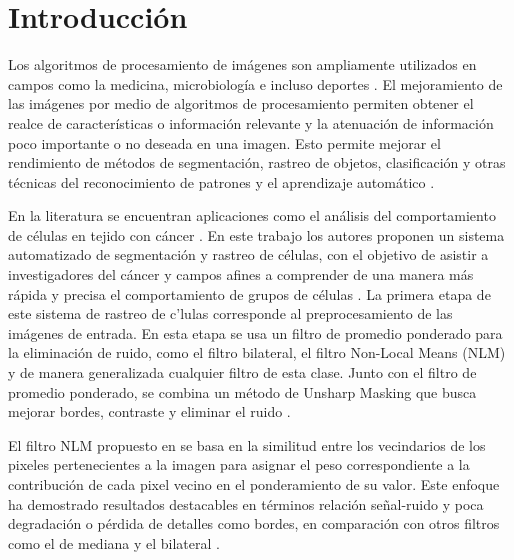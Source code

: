 
\chapter{Introducción}
\label{chp:intro}

Los algoritmos de procesamiento de im\'agenes son ampliamente utilizados en campos como la medicina, microbiolog\'ia e incluso deportes \cite{Aggarwal2011,	Ekin2003, Ekin2003}. El mejoramiento de las im\'agenes por medio de algoritmos de procesamiento permiten obtener el realce de caracter\'isticas o informaci\'on relevante y la atenuaci\'on de informaci\'on poco importante o no deseada en una imagen. Esto permite mejorar el rendimiento de m\'etodos de segmentaci\'on, rastreo de objetos, clasificaci\'on y otras t\'ecnicas del reconocimiento de patrones y el aprendizaje autom\'atico \cite{BF2014,IMPROVESEGMENTATIONBF,CONCAPAN2016}. 

En la literatura se encuentran aplicaciones como el an\'alisis del comportamiento de c\'elulas en tejido con  c\'ancer \cite{saenz2015deceived}. En este trabajo los autores proponen un sistema automatizado de segmentaci\'on y rastreo de c\'elulas, con el objetivo de asistir a investigadores del c\'ancer y campos afines a comprender de una  manera m\'as r\'apida y precisa el comportamiento de grupos de c\'elulas \cite{saenz2015deceived}. La primera etapa de este sistema de rastreo de c\e'lulas corresponde al preprocesamiento de las im\'agenes de entrada. En esta etapa se usa un filtro de promedio ponderado para la eliminaci\'on de ruido, como el filtro bilateral, el filtro Non-Local Means (NLM) y de manera generalizada cualquier filtro de esta clase. Junto con el filtro de promedio ponderado, se combina un m\'etodo de Unsharp Masking que busca mejorar bordes, contraste y eliminar el ruido \cite{saenz2015deceived}.

El filtro NLM propuesto en \cite{buades2005non} se basa en la similitud entre los vecindarios de los pixeles pertenecientes a la imagen para asignar el peso correspondiente a la contribuci\'on de cada pixel vecino en el ponderamiento de su valor. Este enfoque ha demostrado resultados destacables en t\'erminos relaci\'on se\~nal-ruido y poca degradaci\'on o p\'erdida de detalles como bordes, en comparaci\'on con otros filtros como el de mediana y el bilateral \cite{CONCAPAN2016}. 

